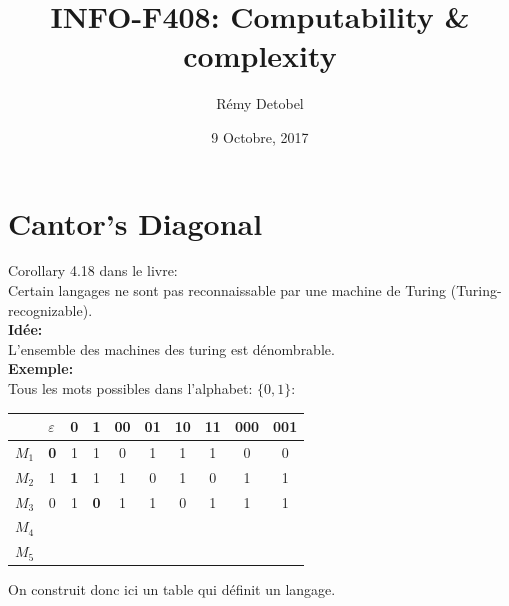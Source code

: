 \documentclass[a4paper,12pt]{article}
\title{INFO-F408: Computability \& complexity}
\date{9 Octobre, 2017}
\author{Rémy Detobel}
\begin{document}
\maketitle
\newpage

\section{Cantor's Diagonal}
  Corollary 4.18 dans le livre:\\
  Certain langages ne sont pas reconnaissable par une machine de Turing (Turing-recognizable).\\
  \textbf{Idée:}\\
  L'ensemble des machines des turing est dénombrable.\\

  \textbf{Exemple:}\\
  Tous les mots possibles dans l'alphabet: $\{0, 1\}$:\\

  \begin{table}[h]
    \centering
    \begin{tabular}{l|ccccccccc}
      & \multicolumn{1}{l}{$\varepsilon$} & \multicolumn{1}{l}{0} & \multicolumn{1}{l}{1} & \multicolumn{1}{l}{00} & \multicolumn{1}{l}{01} & \multicolumn{1}{l}{10} & \multicolumn{1}{l}{11} & \multicolumn{1}{l}{000} & \multicolumn{1}{l}{001} \\ \hline
      $M_1$ & \textbf{0}        & 1                     & 1                     & 0                      & 1                      & 1                      & 1                      & 0                       & 0  \\
      $M_2$ & 1                 & \textbf{1}            & 1                     & 1                      & 0                      & 1                      & 0                      & 1                       & 1  \\
      $M_3$ & 0                 & 1                     & \textbf{0}            & 1                      & 1                      & 0                      & 1                      & 1                       & 1  \\
      $M_4$ &                   &                       &                       &                        &                        &                        &                        &                         &    \\
      $M_5$ &                   &                       &                       &                        &                        &                        &                        &                         &
    \end{tabular}
  \end{table}
  On construit donc ici un table qui définit un langage.
\end{document}
